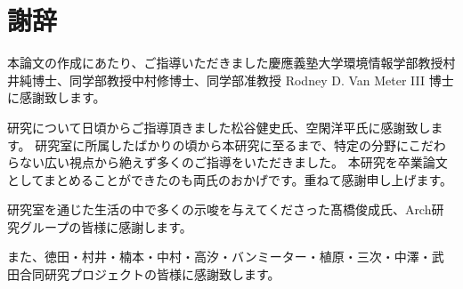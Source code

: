 \chapter*{謝辞}
\label{thanks}

本論文の作成にあたり、ご指導いただきました慶應義塾大学環境情報学部教授村井純博士、同学部教授中村修博士、同学部准教授 Rodney D. Van Meter III 博士に感謝致します。

研究について日頃からご指導頂きました松谷健史氏、空閑洋平氏に感謝致します。
研究室に所属したばかりの頃から本研究に至るまで、特定の分野にこだわらない広い視点から絶えず多くのご指導をいただきました。
本研究を卒業論文としてまとめることができたのも両氏のおかげです。重ねて感謝申し上げます。

研究室を通じた生活の中で多くの示唆を与えてくださった髙橋俊成氏、Arch研究グループの皆様に感謝します。

また、徳田・村井・楠本・中村・高汐・バンミーター・植原・三次・中澤・武田合同研究プロジェクトの皆様に感謝致します。


